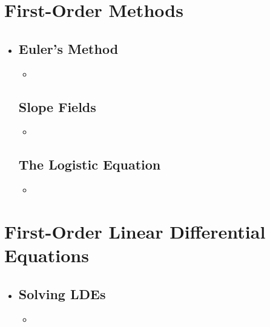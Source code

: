 \section{First-Order Methods}
\begin{itemize}
  \item []

  \subsection{Euler's Method}
  \begin{itemize}
    \item
  \end{itemize}

  \subsection{Slope Fields}
  \begin{itemize}
    \item
  \end{itemize}

  \subsection{The Logistic Equation}
  \begin{itemize}
    \item
  \end{itemize}

\end{itemize}


\section{First-Order Linear Differential Equations}
\begin{itemize}
  \item []

  \subsection{Solving LDEs}
  \begin{itemize}
    \item
  \end{itemize}


\end{itemize}
